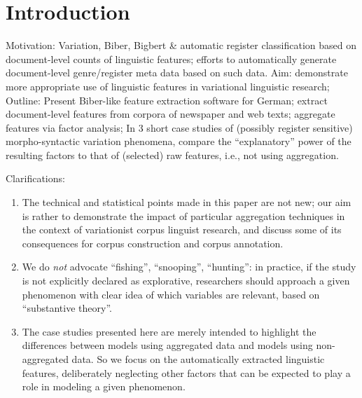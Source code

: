 \section{Introduction}

Motivation: Variation, Biber, Bigbert \& automatic register classification based on document-level counts of linguistic features; efforts to automatically generate document-level genre/register meta data based on such data.
Aim: demonstrate more appropriate use of linguistic features in variational linguistic research;
Outline: Present Biber-like feature extraction software for German; extract document-level features from corpora of newspaper and web texts; aggregate features via factor analysis; 
In 3 short case studies of (possibly register sensitive) morpho-syntactic variation phenomena, compare the ``explanatory'' power of the resulting factors to that of (selected) raw features, i.e., not using aggregation. 

Clarifications:
\begin{enumerate}
  \item The technical and statistical points made in this paper are not new; our aim is rather to demonstrate the impact of particular aggregation techniques in the context of variationist corpus linguist research, and discuss some of its consequences for corpus construction and corpus annotation. 

  \item We do \textit{not} advocate ``fishing'', ``snooping'', ``hunting'': in practice, if the  study is not explicitly declared as explorative, researchers should approach a given phenomenon with clear idea of which variables are relevant, based on ``substantive theory''.

  \item The case studies presented here are merely intended to highlight the differences between models using aggregated data and models using non-aggregated data. So we focus on the automatically extracted linguistic features, deliberately neglecting other factors that can be expected to play a role in modeling a given phenomenon.
\end{enumerate}
